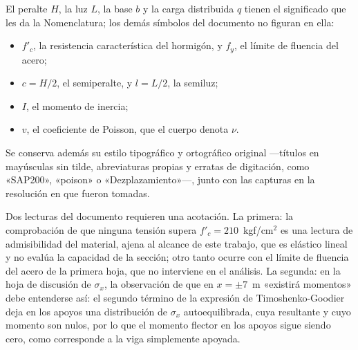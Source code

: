 El peralte $H$, la luz $L$, la base $b$ y la carga distribuida $q$ tienen el significado que les da la Nomenclatura; los demás símbolos del documento no figuran en ella:

\begin{itemize}
    \item $f'_c$, la resistencia característica del hormigón, y $f_y$, el límite de fluencia del acero;
    \item $c = H/2$, el semiperalte, y $l = L/2$, la semiluz;
    \item $I$, el momento de inercia;
    \item $v$, el coeficiente de Poisson, que el cuerpo denota $\nu$.
\end{itemize}

Se conserva además su estilo tipográfico y ortográfico original —títulos en mayúsculas sin tilde, abreviaturas propias y erratas de digitación, como «SAP200», «poison» o «Dezplazamiento»—, junto con las capturas en la resolución en que fueron tomadas.

Dos lecturas del documento requieren una acotación. La primera: la comprobación de que ninguna tensión supera $f'_c = 210$~kgf/cm$^2$ es una lectura de admisibilidad del material, ajena al alcance de este trabajo, que es elástico lineal y no evalúa la capacidad de la sección; otro tanto ocurre con el límite de fluencia del acero de la primera hoja, que no interviene en el análisis. La segunda: en la hoja de discusión de $\sigma_x$, la observación de que en $x = \pm 7$~m «existirá momentos» debe entenderse así: el segundo término de la expresión de Timoshenko-Goodier deja en los apoyos una distribución de $\sigma_x$ autoequilibrada, cuya resultante y cuyo momento son nulos, por lo que el momento flector en los apoyos sigue siendo cero, como corresponde a la viga simplemente apoyada.





